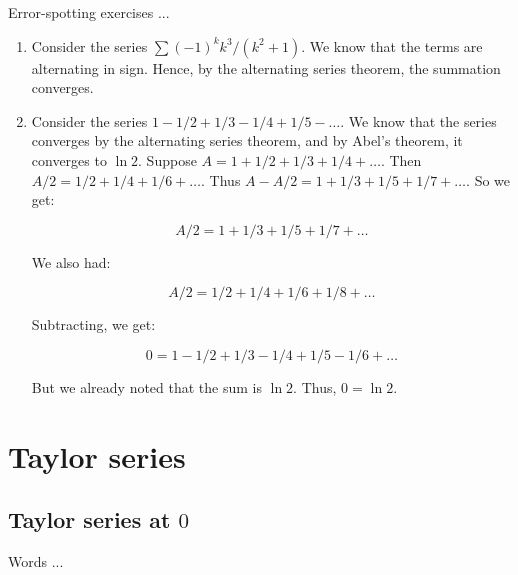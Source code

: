\documentclass[10pt]{amsart}
\begin{document}
Error-spotting exercises ...

\begin{enumerate}
\item Consider the series $\sum (-1)^k k^3/(k^2 + 1)$. We know that
  the terms are alternating in sign. Hence, by the alternating series
  theorem, the summation converges.
\item Consider the series $1 - 1/2 + 1/3 - 1/4 + 1/5 - \dots$. We know
  that the series converges by the alternating series theorem, and by
  Abel's theorem, it converges to $\ln 2$. Suppose $A = 1 + 1/2 + 1/3
  + 1/4 + \dots$. Then $A/2 = 1/2 + 1/4 + 1/6 + \dots$. Thus $A - A/2
  = 1 + 1/3 + 1/5 + 1/7 + \dots$. So we get:

  $$A/2 = 1 + 1/3 + 1/5 + 1/7 + \dots$$

  We also had:

  $$A/2 = 1/2 + 1/4 + 1/6 + 1/8 + \dots$$

  Subtracting, we get:

  $$0 = 1 - 1/2 + 1/3 - 1/4 + 1/5 - 1/6 + \dots$$

  But we already noted that the sum is $\ln 2$. Thus, $0 = \ln 2$.
\end{enumerate}

\section{Taylor series}

\subsection{Taylor series at $0$}

Words ...
\end{document}
